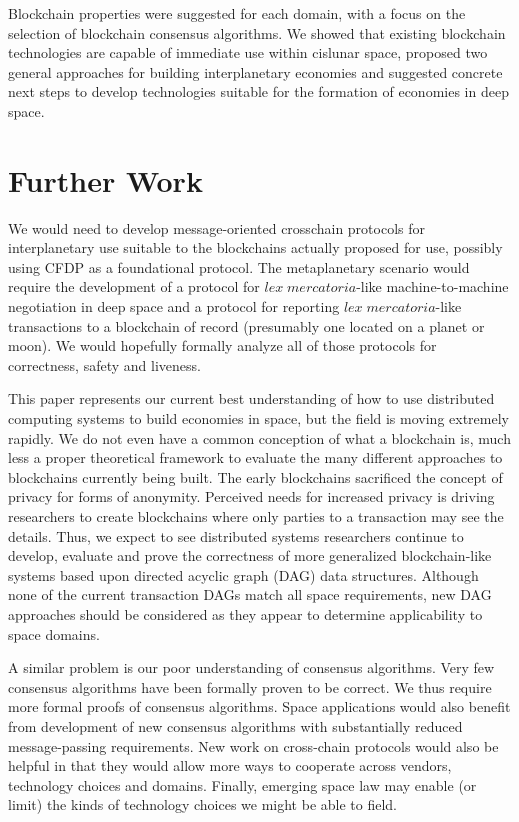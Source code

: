 \documentclass[]{aiaa-tc}%
\begin{document}
Blockchain properties were suggested for each domain, with a focus on the selection of blockchain consensus algorithms. We showed that existing blockchain technologies are capable of immediate use within cislunar space, proposed two general approaches for building interplanetary economies and suggested concrete next steps to develop technologies suitable for the formation of economies in deep space.


\section{Further Work}

We would need to develop message-oriented crosschain protocols for interplanetary use suitable to the blockchains actually proposed for use, possibly using CFDP as a foundational protocol. The metaplanetary scenario would require the development of  a protocol for $\mathit{lex\; mercatoria}$-like machine-to-machine negotiation in deep space and a protocol for reporting $\mathit{lex\; mercatoria}$-like transactions to a blockchain of record (presumably one located on a planet or moon). We would hopefully formally analyze all of those protocols for correctness, safety and liveness.

This paper represents our current best understanding of how to use distributed computing systems to build economies in space, but the field is moving extremely rapidly. We do not even have a common conception of what a blockchain is, much less a proper theoretical framework to evaluate the many different approaches to blockchains currently being built. The early blockchains sacrificed the concept of privacy for forms of anonymity. Perceived needs for increased privacy is driving researchers to create blockchains where only parties to a transaction may see the details. Thus, we expect to see distributed systems researchers continue to develop, evaluate and prove the correctness of more generalized blockchain-like systems based upon directed acyclic graph (DAG) data structures. Although none of the current transaction DAGs match all space requirements, new DAG approaches should be considered as they appear to determine applicability to space domains.

A similar problem is our poor understanding of consensus algorithms. Very few consensus algorithms have been formally proven to be correct. We thus require more formal proofs of consensus algorithms. Space applications would also benefit from development of new consensus algorithms with substantially reduced message-passing requirements. New work on cross-chain protocols would also be helpful in that they would allow more ways to cooperate across vendors, technology choices and domains. Finally, emerging space law may enable (or limit) the kinds of technology choices we might be able to field.
\end{document}
